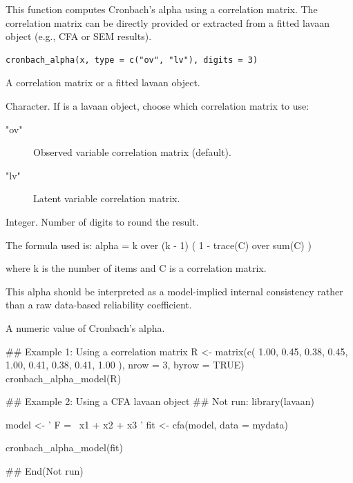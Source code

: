 \documentclass[a4paper]{book}
\begin{document}
%
\begin{Description}
This function computes Cronbach's alpha using a correlation matrix.
The correlation matrix can be directly provided or extracted from a
fitted lavaan object (e.g., CFA or SEM results).
\end{Description}
%
\begin{Usage}
\begin{verbatim}
cronbach_alpha(x, type = c("ov", "lv"), digits = 3)
\end{verbatim}
\end{Usage}
%
\begin{Arguments}
\begin{ldescription}
\item[\code{x}] A correlation matrix or a fitted lavaan object.

\item[\code{type}] Character. If  is a lavaan object, choose which
correlation matrix to use:
\begin{description}

\item["ov"] Observed variable correlation matrix (default).
\item["lv"] Latent variable correlation matrix.

\end{description}


\item[\code{digits}] Integer. Number of digits to round the result.
\end{ldescription}
\end{Arguments}
%
\begin{Details}
The formula used is:
alpha = k over (k - 1) ( 1 - trace(C) over sum(C) )

where k is the number of items and C is a correlation matrix.

This alpha should be interpreted as a model-implied internal consistency
rather than a raw data-based reliability coefficient.
\end{Details}
%
\begin{Value}
A numeric value of Cronbach's alpha.
\end{Value}
%
\begin{Examples}
\begin{ExampleCode}
## Example 1: Using a correlation matrix
R <- matrix(c(
  1.00, 0.45, 0.38,
  0.45, 1.00, 0.41,
  0.38, 0.41, 1.00
), nrow = 3, byrow = TRUE)
cronbach_alpha_model(R)

## Example 2: Using a CFA lavaan object
\#\# Not run: 
library(lavaan)

model <- '
  F =~ x1 + x2 + x3
'
fit <- cfa(model, data = mydata)

cronbach_alpha_model(fit)

## End(Not run)

\end{ExampleCode}
\end{Examples}
\end{document}
